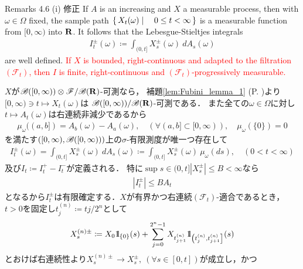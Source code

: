 	\begin{itembox}[l]{Remarks 4.6 (i) 修正}
		If $A$ is an increasing and $X$ a measurable process, then with $\omega \in \Omega$ fixed,
		the sample path $\left\{\, X_t(\omega) \mid \quad 0 \leq t < \infty\, \right\}$ is a measurable function from $[0,\infty)$
		into $\mathbf{R}$. It follows that the Lebesgue-Stieltjes integrals
		\begin{align}
			I^{\pm}_t(\omega) \coloneqq
			\int_{(0,t]} X^\pm_s(\omega)\ dA_s(\omega)
		\end{align}
		are well defined. \textcolor{red}{If $X$ is bounded, right-continuous and adapted
		to the filtration $(\mathscr{F}_t)$, then $I$ is finite, right-continuous and 
		$(\mathscr{F}_t)$-progressively measurable.}
	\end{itembox}
	
	\begin{prf}
		$X$が$\mathscr{B}([0,\infty)) \otimes \mathscr{F}/\mathscr{B}(\mathbf{R})$-可測なら，
		補題\ref{lem:Fubini_lemma_1} (P. \pageref{lem:Fubini_lemma_1})より
		$[0,\infty) \ni t \longmapsto X_t(\omega)$は
		$\mathscr{B}([0,\infty))/\mathscr{B}(\mathbf{R})$-可測である．
		また全ての$\omega \in \Omega$に対し$t \longmapsto A_t(\omega)$は右連続非減少であるから
		\begin{align}
			\mu_\omega((a,b]) = A_b(\omega) - A_a(\omega),
			\quad (\forall (a,b] \subset [0,\infty)),
			\quad \mu_\omega(\{0\}) = 0
		\end{align}
		を満たす$\left([0,\infty),\mathscr{B}([0,\infty))\right)$上の$\sigma$-有限測度が唯一つ存在して
		\begin{align}
			I^\pm_t(\omega) = \int_{(0,t]} X^\pm_s(\omega)\ dA_s(\omega)
			\coloneqq \int_{(0,t]} X^\pm_s(\omega)\ \mu_\omega(ds),
			\quad (0 < t < \infty)
		\end{align}
		及び$I_t \coloneqq I^+_t - I^-_t$が定義される．
		特に$\sup{s \in (0,t]}{|X^\pm_s|} \leq B < \infty$なら
		\begin{align}
			\left|I^\pm_t\right| \leq B A_t
		\end{align}
		となるから$I^\pm_t$は有限確定する．$X$が有界かつ右連続$(\mathscr{F}_t)$-適合であるとき，
		$t>0$を固定し$t^{(n)}_j \coloneqq tj/2^n$として
		\begin{align}
			X^{(n)\pm}_s \coloneqq X_0 \mbox{1}\hspace{-0.25em}\mbox{l}_{\{0\}}(s) + 
				\sum_{j=0}^{2^n-1} X_{t^{(n)}_{j+1}} 
				\mbox{1}\hspace{-0.25em}\mbox{l}_{\left(t^{(n)}_j,t^{(n)}_{j+1}\right]}(s)
		\end{align}
		とおけば右連続性より$X^{(n)\pm}_s \longrightarrow X^\pm_s,\ (\forall s \in [0,t])$が成立し，かつ
		\begin{align}

\end{align}
\end{prf}
